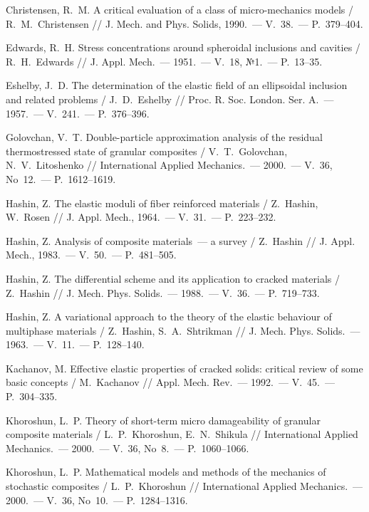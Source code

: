 \begin{biblist}{99}
Christensen, R.~M. 
A critical evaluation of a class of micro-mechanics models 
/ R.~M.~Christensen 
// J. Mech. and Phys. Solids, 1990.~--- V.~38.~--- P.~379--404.

Edwards, R.~H. 
Stress concentrations around spheroidal inclusions and cavities 
/ R.~H.~Edwards 
// J. Appl. Mech.~--- 1951.~--- V.~18, №1.~--- P.~13--35.

Eshelby, J.~D. 
The determination of the elastic field of an ellipsoidal inclusion and related problems  
/ J.~D.~Eshelby 
// Proc. R. Soc. London. Ser. A.~--- 1957.~--- V.~241.~--- P.~376--396.

Golovchan, V.~T. 
Double-particle approximation analysis of the residual thermostressed state of granular composites 
/ V.~T.~Golovchan, N.~V.~Litoshenko 
// International Applied Mechanics.~--- 2000.~--- V.~36, No~12.~--- P.~1612--1619.

Hashin, Z. 
The elastic moduli of fiber reinforced materials 
/ Z.~Hashin, W.~Rosen 
// J. Appl. Mech., 1964.~--- V.~31.~--- P.~223--232.

Hashin, Z. 
Analysis of composite materials~--- a survey 
/ Z.~Hashin 
// J. Appl. Mech., 1983.~--- V.~50.~--- P.~481--505.

Hashin, Z. 
The differential scheme and its application to cracked materials  
/ Z.~Hashin 
// J. Mech. Phys. Solids.~--- 1988.~--- V.~36.~--- P.~719--733.

Hashin, Z. 
A variational approach to the theory of the elastic behaviour of multiphase materials    
/ Z.~Hashin, S.~A.~Shtrikman 
// J. Mech. Phys. Solids.~--- 1963.~--- V.~11.~--- P.~128--140.

Kachanov, M. 
Effective elastic properties of cracked solids: critical review of some basic concepts   
/ M.~Kachanov 
// Appl. Mech. Rev.~--- 1992.~--- V.~45.~--- P.~304--335.

Khoroshun, L.~P. 
Theory of short-term micro damageability of granular composite materials
/ L.~P.~Khoroshun, E.~N.~Shikula 
// International Applied Mechanics.~--- 2000.~--- V.~36, No~8.~--- P.~1060--1066.

Khoroshun, L.~P. 
Mathematical models and methods of the mechanics of stochastic composites 
/ L.~P.~Khoroshun 
// International Applied Mechanics.~--- 2000.~--- V.~36, No~10.~--- P.~1284--1316.


\end{biblist}
